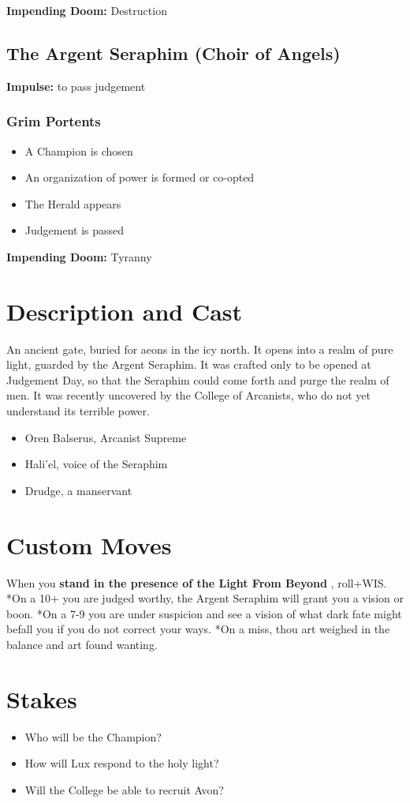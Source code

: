 \textbf{Impending Doom:}
Destruction
\subsection{The Argent Seraphim (Choir of Angels)}


\textbf{Impulse:}
to pass judgement
\subsubsection{Grim Portents}
\begin{itemize}
\item A Champion is chosen
\item An organization of power is formed or co-opted
\item The Herald appears
\item Judgement is passed

\end{itemize}


\textbf{Impending Doom:}
Tyranny
\section*{Description and Cast}


An ancient gate, buried for aeons in the icy north. It opens into a realm of pure light, guarded by the Argent Seraphim. It was crafted only to be opened at Judgement Day, so that the Seraphim could come forth and purge the realm of men. It was recently uncovered by the College of Arcanists, who do not yet understand its terrible power.
\begin{itemize}
\item Oren Balserus, Arcanist Supreme
\item Hali'el, voice of the Seraphim
\item Drudge, a manservant

\end{itemize}
\section*{Custom Moves}


When you \textbf{stand in the presence of the Light From Beyond}
, roll+WIS. *On a 10+ you are judged worthy, the Argent Seraphim will grant you a vision or boon. *On a 7-9 you are under suspicion and see a vision of what dark fate might befall you if you do not correct your ways. *On a miss, thou art weighed in the balance and art found wanting.
\section*{Stakes}
\begin{itemize}
\item Who will be the Champion?
\item How will Lux respond to the holy light?
\item Will the College be able to recruit Avon?

\end{itemize}


